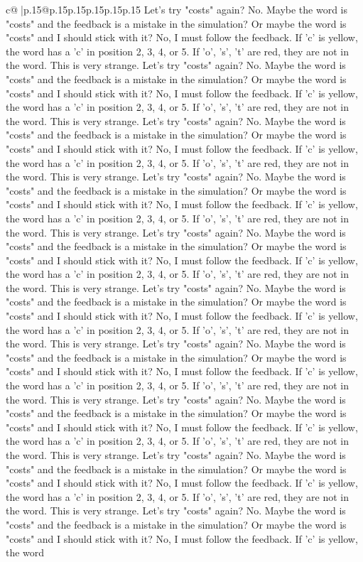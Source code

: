 \documentclass{article}
\begin{document}
{\begin{supertabular}{c@{$\;$}|p{.15\linewidth}@{}p{.15\linewidth}p{.15\linewidth}p{.15\linewidth}p{.15\linewidth}p{.15\linewidth}}
{{{Let's try "costs" again? No. Maybe the word is "costs" and the feedback is a mistake in the simulation? Or maybe the word is "costs" and I should stick with it? No, I must follow the feedback. If 'c' is yellow, the word has a 'c' in position 2, 3, 4, or 5. If 'o', 's', 't' are red, they are not in the word. This is very strange. Let's try "costs" again? No. Maybe the word is "costs" and the feedback is a mistake in the simulation? Or maybe the word is "costs" and I should stick with it? No, I must follow the feedback. If 'c' is yellow, the word has a 'c' in position 2, 3, 4, or 5. If 'o', 's', 't' are red, they are not in the word. This is very strange. Let's try "costs" again? No. Maybe the word is "costs" and the feedback is a mistake in the simulation? Or maybe the word is "costs" and I should stick with it? No, I must follow the feedback. If 'c' is yellow, the word has a 'c' in position 2, 3, 4, or 5. If 'o', 's', 't' are red, they are not in the word. This is very strange. Let's try "costs" again? No. Maybe the word is "costs" and the feedback is a mistake in the simulation? Or maybe the word is "costs" and I should stick with it? No, I must follow the feedback. If 'c' is yellow, the word has a 'c' in position 2, 3, 4, or 5. If 'o', 's', 't' are red, they are not in the word. This is very strange. Let's try "costs" again? No. Maybe the word is "costs" and the feedback is a mistake in the simulation? Or maybe the word is "costs" and I should stick with it? No, I must follow the feedback. If 'c' is yellow, the word has a 'c' in position 2, 3, 4, or 5. If 'o', 's', 't' are red, they are not in the word. This is very strange. Let's try "costs" again? No. Maybe the word is "costs" and the feedback is a mistake in the simulation? Or maybe the word is "costs" and I should stick with it? No, I must follow the feedback. If 'c' is yellow, the word has a 'c' in position 2, 3, 4, or 5. If 'o', 's', 't' are red, they are not in the word. This is very strange. Let's try "costs" again? No. Maybe the word is "costs" and the feedback is a mistake in the simulation? Or maybe the word is "costs" and I should stick with it? No, I must follow the feedback. If 'c' is yellow, the word has a 'c' in position 2, 3, 4, or 5. If 'o', 's', 't' are red, they are not in the word. This is very strange. Let's try "costs" again? No. Maybe the word is "costs" and the feedback is a mistake in the simulation? Or maybe the word is "costs" and I should stick with it? No, I must follow the feedback. If 'c' is yellow, the word has a 'c' in position 2, 3, 4, or 5. If 'o', 's', 't' are red, they are not in the word. This is very strange. Let's try "costs" again? No. Maybe the word is "costs" and the feedback is a mistake in the simulation? Or maybe the word is "costs" and I should stick with it? No, I must follow the feedback. If 'c' is yellow, the word has a 'c' in position 2, 3, 4, or 5. If 'o', 's', 't' are red, they are not in the word. This is very strange. Let's try "costs" again? No. Maybe the word is "costs" and the feedback is a mistake in the simulation? Or maybe the word is "costs" and I should stick with it? No, I must follow the feedback. If 'c' is yellow, the word }}}
\end{supertabular}}
\end{document}
